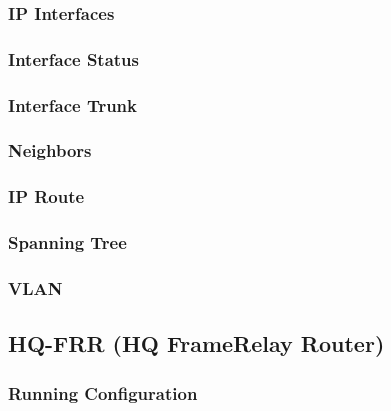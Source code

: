 \subsubsection{IP Interfaces}


\subsubsection{Interface Status}


\subsubsection{Interface Trunk}


\subsubsection{Neighbors}


\subsubsection{IP Route}


\subsubsection{Spanning Tree}


\subsubsection{VLAN}





\subsection{HQ-FRR  (HQ FrameRelay Router)}
\subsubsection{Running Configuration}


